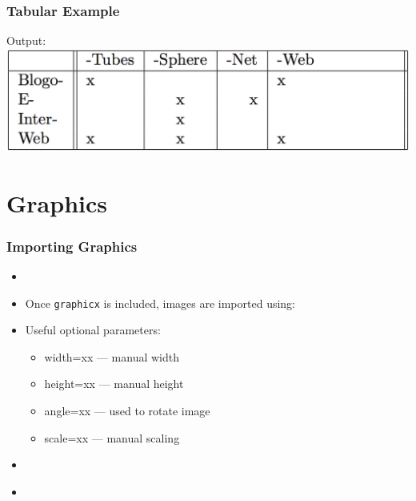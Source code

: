 \documentclass[notes=only]{beamer}
\newcommand{\snip}[1]
{
	
}
\begin{document}
\begin{frame} \frametitle{Tabular Example}
    Output:
    \includegraphics[width=\textwidth]{Examples/6-tables.png}
\end{frame}


\section{Graphics}
    \begin{frame}
    \frametitle{Importing Graphics}
    \begin{itemize}
        \item \snip{graphicx.tex}
        \item Once \texttt{graphicx} is included, images are imported using:\\	
        \snip{includegraphics.tex}
        \item Useful optional parameters:
        \begin{itemize}
            \item width=xx --- manual width
            \item height=xx --- manual height
            \item angle=xx --- used to rotate image
            \item scale=xx --- manual scaling
        \end{itemize}
            
        \item \snip{textwidth.tex}\ \\
        \item \snip{05textwidth.tex}
    \end{itemize}
\end{frame}
\end{document}
